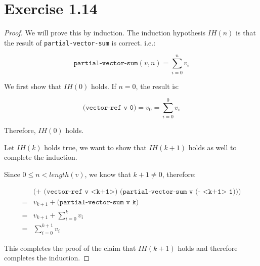 \section*{Exercise 1.14}

\begin{proof}
We will prove this by induction.
The induction hypothesis $IH(n)$ is that
the result of \texttt{partial-vector-sum} is correct. i.e.:

\[
    \texttt{partial-vector-sum}(v,n) = \sum_{i=0}^{n}v_i
\]

We first show that $IH(0)$ holds. If $n=0$, the result is:

\[
    \texttt{(vector-ref v 0)} = v_0 = \sum_{i=0}^{0}v_i
\]

Therefore, $IH(0)$ holds.

Let $IH(k)$ holds true, we want to show that $IH(k+1)$ holds as well
to complete the induction.

Since $0 \le n < length(v)$, we know that $k + 1 \neq 0$, therefore:

\begin{align*}
    & \texttt{(+ (vector-ref v <k+1>) (partial-vector-sum v (- <k+1> 1)))} \\
    = & v_{k+1} + \texttt{(partial-vector-sum v k)} \\
    = & v_{k+1} + \sum_{i=0}^{k}v_i \\
    = & \sum_{i=0}^{k+1}v_i
\end{align*}

This completes the proof of the claim that $IH(k+1)$ holds and therefore
completes the induction.

\end{proof}

